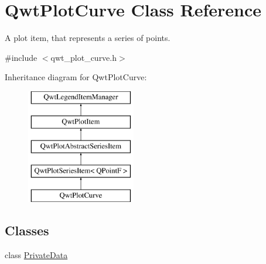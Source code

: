 \hypertarget{class_qwt_plot_curve}{\section{Qwt\-Plot\-Curve Class Reference}
\label{class_qwt_plot_curve}
}


A plot item, that represents a series of points.  




{\ttfamily \#include $<$qwt\-\_\-plot\-\_\-curve.\-h$>$}

Inheritance diagram for Qwt\-Plot\-Curve\-:\begin{figure}[H]
\begin{center}
\leavevmode
\includegraphics[height=5.000000cm]{class_qwt_plot_curve}
\end{center}
\end{figure}
\subsection*{Classes}
\begin{DoxyCompactItemize}
\item 
class \hyperlink{class_qwt_plot_curve_1_1_private_data}{Private\-Data}
\end{DoxyCompactItemize}
